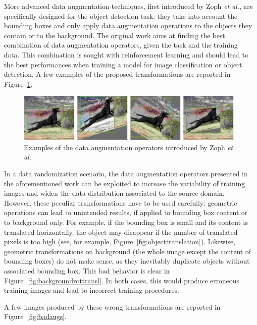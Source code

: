 \documentclass[%
    corpo=12pt,
    twoside,
    stile=classica,   
    tipotesi=magistrale,
    evenboxes,
    english,
	numerazioneromana,
]{toptesi}
\begin{document}
\bigskip
More advanced data augmentation techniques, first introduced by Zoph \textit{et al.}\cite{zoph2019learning}, are specifically designed for the object detection task: they take into account the bounding boxes and only apply data augmentation operations to the objects they contain or to the background. The original work aims at finding the best combination of data augmentation operators, given the task and the training data. This combination is sought with reinforcement learning and should lead to the best performances when training a model for image classification or object detection. A few examples of the proposed transformations are reported in Figure~\ref{fig:learndataaug}.

\begin{figure}[ht!]
	\centering
	\includegraphics[width=0.9\linewidth]{imgs/learndataaug.png}
	\caption{Examples of the data augmentation operators introduced by Zoph \textit{et al.}\cite{zoph2019learning}}
	\label{fig:learndataaug}
\end{figure}

\medskip
In a data randomization scenario, the data augmentation operators presented in the aforementioned work can be exploited to increase the variability of training images and widen the data distribution associated to the source domain. However, these peculiar transformations have to be used carefully: geometric operations can lead to unintended results, if applied to bounding box content or to background only. For example, if the bounding box is small and its content is translated horizontally, the object may disappear if the number of translated pixels is too high (see, for example, Figure~\ref{fig:objecttranslation}). Likewise, geometric transformations on background (the whole image except the content of bounding boxes) do not make sense, as they inevitably duplicate objects without associated bounding box. This bad behavior is clear in Figure~\ref{fig:backgroundrottransl}. In both cases, this would produce erroneous training images and lead to incorrect training procedures.

A few images produced by these wrong transformations are reported in Figure~\ref{fig:badaugs}.
\end{document}
